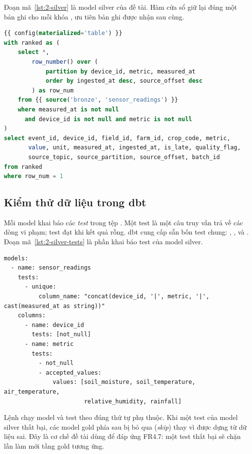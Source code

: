 Đoạn mã~\ref{lst:2-silver} là model silver của đề tài. Hàm cửa sổ  giữ lại đúng một bản ghi cho mỗi khóa , ưu tiên bản ghi được nhận sau cùng.

\begin{lstlisting}[language=SQL, caption={Model silver khử trùng lặp (\texttt{dbt/models/silver/sensor\_readings.sql}, rút gọn)}, label={lst:2-silver}]
{{ config(materialized='table') }}
with ranked as (
    select *,
        row_number() over (
            partition by device_id, metric, measured_at
            order by ingested_at desc, source_offset desc
        ) as row_num
    from {{ source('bronze', 'sensor_readings') }}
    where measured_at is not null
      and device_id is not null and metric is not null
)
select event_id, device_id, field_id, farm_id, crop_code, metric,
       value, unit, measured_at, ingested_at, is_late, quality_flag,
       source_topic, source_partition, source_offset, batch_id
from ranked
where row_num = 1
\end{lstlisting}

\subsection{Kiểm thử dữ liệu trong dbt}
\label{sec:2-dbt-tests}

Mỗi model khai báo các \emph{test} trong tệp . Một test là một câu truy vấn trả về các dòng vi phạm; test đạt khi kết quả rỗng. dbt cung cấp sẵn bốn test chung: , ,  và . Đoạn mã~\ref{lst:2-silver-tests} là phần khai báo test của model silver.

\begin{lstlisting}[caption={Test của model silver (\texttt{dbt/models/silver/schema.yml}, rút gọn)}, label={lst:2-silver-tests}]
models:
  - name: sensor_readings
    tests:
      - unique:
          column_name: "concat(device_id, '|', metric, '|', cast(measured_at as string))"
    columns:
      - name: device_id
        tests: [not_null]
      - name: metric
        tests:
          - not_null
          - accepted_values:
              values: [soil_moisture, soil_temperature, air_temperature,
                       relative_humidity, rainfall]
\end{lstlisting}

Lệnh  chạy model và test theo đúng thứ tự phụ thuộc. Khi một test của model silver thất bại, các model gold phía sau bị bỏ qua (\emph{skip}) thay vì được dựng từ dữ liệu sai. Đây là cơ chế đề tài dùng để đáp ứng FR4.7: một test thất bại sẽ chặn lần làm mới tầng gold tương ứng.

